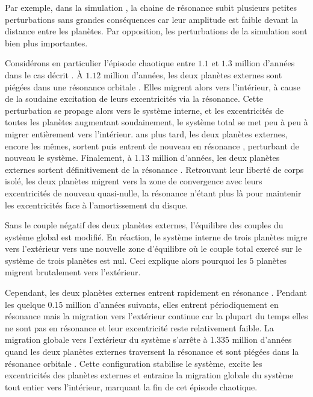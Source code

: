 Par exemple, dans la simulation , la chaine de  résonance subit plusieurs petites perturbations sans grandes conséquences car leur amplitude est faible devant la distance entre les planètes. Par opposition, les perturbations de la simulation   sont bien plus importantes.

Considérons en particulier l'épisode chaotique entre $1.1$ et $1.3$ million d'années dans le cas décrit . À $1.12$ million d'années, les deux planètes externes sont piégées dans une résonance orbitale . Elles migrent alors vers l'intérieur, à cause de la soudaine excitation de leurs excentricités via la résonance. Cette perturbation se propage alors vers le système interne, et les excentricités de toutes les planètes augmentant soudainement, le système total se met peu à peu à migrer entièrement vers l'intérieur.  ans plus tard, les deux planètes externes, encore les mêmes, sortent puis entrent de nouveau en résonance , perturbant de nouveau le système. Finalement, à 1.13 million d'années, les deux planètes externes sortent définitivement de la résonance . Retrouvant leur liberté de corps isolé, les deux planètes migrent vers la zone de convergence avec leurs excentricités de nouveau quasi-nulle, la résonance n'étant plus là pour 
maintenir les 
excentricités face à l'amortissement du disque.

Sans le couple négatif des deux planètes externes, l'équilibre des couples du système global est modifié. En réaction, le système interne de trois planètes migre vers l'extérieur vers une nouvelle zone d'équilibre où le couple total exercé sur le système de trois planètes est nul. Ceci explique alors pourquoi les 5 planètes migrent brutalement vers l'extérieur. 

Cependant, les deux planètes externes entrent rapidement en résonance . Pendant les quelque 0.15 million d'années suivants, elles entrent périodiquement en résonance  mais la migration vers l'extérieur continue car la plupart du temps elles ne sont pas en résonance et leur excentricité reste relativement faible. La migration globale vers l'extérieur du système s'arrête à 1.335 million d'années quand les deux planètes externes traversent la résonance  et sont piégées dans la résonance orbitale . Cette configuration stabilise le système, excite les excentricités des planètes externes et entraine la migration globale du système tout entier vers l'intérieur, marquant la fin de cet épisode chaotique. 

